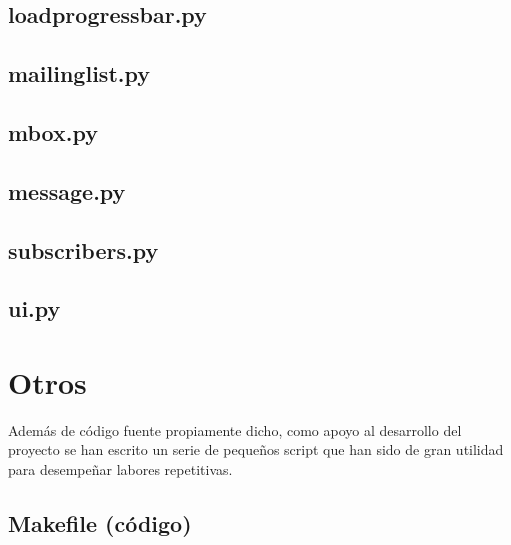 \subsection*{loadprogressbar.py}



\subsection*{mailinglist.py}



\subsection*{mbox.py}



\subsection*{message.py}



\subsection*{subscribers.py}



\subsection*{ui.py}



\section*{Otros}

Además de código fuente propiamente dicho, como apoyo al desarrollo del proyecto
se han escrito un serie de pequeños script que han sido de gran utilidad para
desempeñar labores repetitivas.

\subsection*{Makefile (código)}

